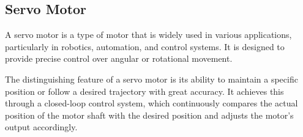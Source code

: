 \documentclass[english]{article}
\begin{document}
\subsection{Servo Motor}
A servo motor is a type of motor that is widely used in various 
applications, particularly in robotics, automation, and control systems.
It is designed to provide precise control over angular or rotational
movement. \newline

The distinguishing feature of a servo motor is its ability to maintain
 a specific position or follow a desired trajectory with great accuracy.
It achieves this through a closed-loop control system, which continuously
compares the actual position of the motor shaft with the desired position
and adjusts the motor's output accordingly. 
\end{document}
